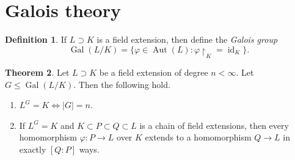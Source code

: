 \documentclass[10pt,letterpaper,cm]{nupset}
\theoremstyle{definition}
\newtheorem{definition}{Definition}[subsection]
\theoremstyle{theorem}
\newtheorem{theorem}[definition]{Theorem}
\theoremstyle{remark}
\newcommand{\1}{\mathbf{1}}
\newcommand{\0}{\vec 0}
\DeclareMathOperator{\id}{id}
\DeclareMathOperator{\gal}{Gal}
\DeclareMathOperator{\aut}{Aut}
\begin{document}
\section{Galois theory}

\begin{definition}
If $L \supset K$ is a field extension, then define the \textit{Galois group} $$\gal(L/K) = \{\varphi \in \aut(L) : \varphi\restriction_K = \id_K\}.    $$
\end{definition}

\begin{theorem}
Let $L \supset K$ be a field extension of degree $n<\infty$. Let $G \leq  \gal(L/K)$. Then the following hold.
\begin{enumerate}[label=(\alph*)]
\item $L^G = K \iff |G| = n$.
\item  If $L^G = K$ and $K \subset P \subset Q \subset L$ is a chain of field extensions, then every homomorphism $\varphi : P \to L$ over $K$ extends to a homomorphism $Q \to L$ in exactly $[Q:P]$ ways. 
\end{enumerate}
\end{theorem}
\end{document}

